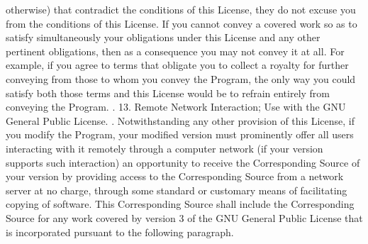\begin{script}
 otherwise) that contradict the conditions of this License, they do not
 excuse you from the conditions of this License.  If you cannot convey a
 covered work so as to satisfy simultaneously your obligations under this
 License and any other pertinent obligations, then as a consequence you may
 not convey it at all.  For example, if you agree to terms that obligate you
 to collect a royalty for further conveying from those to whom you convey
 the Program, the only way you could satisfy both those terms and this
 License would be to refrain entirely from conveying the Program.
 .
   13. Remote Network Interaction; Use with the GNU General Public License.
 .
   Notwithstanding any other provision of this License, if you modify the
 Program, your modified version must prominently offer all users
 interacting with it remotely through a computer network (if your version
 supports such interaction) an opportunity to receive the Corresponding
 Source of your version by providing access to the Corresponding Source
 from a network server at no charge, through some standard or customary
 means of facilitating copying of software.  This Corresponding Source
 shall include the Corresponding Source for any work covered by version 3
 of the GNU General Public License that is incorporated pursuant to the
 following paragraph.
\end{script}
